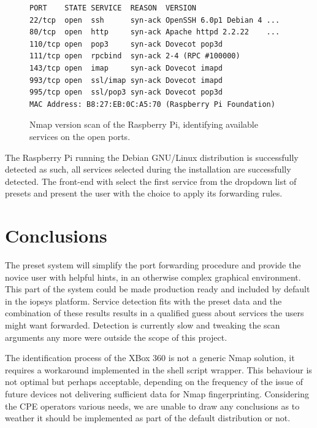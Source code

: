 \documentclass[a4paper,11pt,makeidx]{kth-bcs}
\begin{document}
   \begin{figure}[h]
      \centering
      \label{fig:rasp_scan}
      \begin{lstlisting}[escapechar=!]
PORT    STATE SERVICE  REASON  VERSION
22/tcp  open  ssh      syn-ack OpenSSH 6.0p1 Debian 4 ...
80/tcp  open  http     syn-ack Apache httpd 2.2.22    ...
110/tcp open  pop3     syn-ack Dovecot pop3d
111/tcp open  rpcbind  syn-ack 2-4 (RPC #100000)
143/tcp open  imap     syn-ack Dovecot imapd
993/tcp open  ssl/imap syn-ack Dovecot imapd
995/tcp open  ssl/pop3 syn-ack Dovecot pop3d
MAC Address: B8:27:EB:0C:A5:70 (Raspberry Pi Foundation)
\end{lstlisting}
      \caption{
         \small{
Nmap version scan of the Raspberry Pi, identifying available services on the open ports.
         }
      }
   \end{figure}
The Raspberry Pi running the Debian GNU/Linux distribution is successfully detected as such, all services selected during the installation are successfully detected.
The front-end with select the first service from the dropdown list of presets and present the user with the choice to apply its forwarding rules.

\chapter{Conclusions}

The preset system will simplify the port forwarding procedure and provide the novice user with helpful hints, in an otherwise complex graphical environment.
This part of the system could be made production ready and included by default in the iopsys platform.
Service detection fits with the preset data and the combination of these results results in a qualified guess about services the users might want forwarded.
Detection is currently slow and tweaking the scan arguments any more were outside the scope of this project.

The identification process of the XBox 360 is not a generic Nmap solution, it requires a workaround implemented in the shell script wrapper.
This behaviour is not optimal but perhaps acceptable, depending on the frequency of the issue of future devices not delivering sufficient data for Nmap fingerprinting.
Considering the CPE operators various needs, we are unable to draw any conclusions as to weather it should be implemented as part of the default distribution or not.
\end{document}
